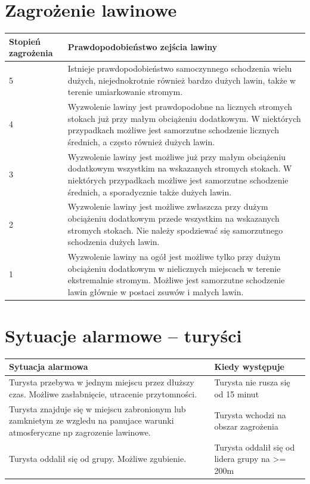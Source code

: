 \documentclass[a4paper,12pt]{article}
\begin{document}
\section{Zagrożenie lawinowe}
\begin{center}
    \begin{longtable}{ | l | p{10cm} |}
    \hline
    \textbf{Stopień zagrożenia} & \textbf{Prawdopodobieństwo zejścia lawiny}\\ \hline
    5 & Istnieje prawdopodobieństwo samoczynnego schodzenia wielu dużych, niejednokrotnie
również bardzo dużych lawin, także w terenie
umiarkowanie stromym. \\\hline
	4 & Wyzwolenie lawiny jest prawdopodobne na
licznych stromych stokach już przy małym
obciążeniu dodatkowym. W niektórych
przypadkach możliwe jest samorzutne
schodzenie licznych średnich, a często
również dużych lawin.\\\hline
	3 & Wyzwolenie lawiny jest możliwe już przy
małym obciążeniu dodatkowym wszystkim na
wskazanych stromych stokach. W niektórych
przypadkach możliwe jest samorzutne
schodzenie średnich, a sporadycznie także
dużych lawin.\\\hline
	2 & Wyzwolenie lawiny jest możliwe zwłaszcza
przy dużym obciążeniu dodatkowym przede
wszystkim na wskazanych stromych stokach.
Nie należy spodziewać się samorzutnego
schodzenia dużych lawin.\\\hline
	1 & Wyzwolenie lawiny na ogół jest możliwe tylko
przy dużym obciążeniu dodatkowym w
nielicznych miejscach w terenie ekstremalnie
stromym. Możliwe jest samorzutne schodzenie
lawin głównie w postaci zsuwów i małych
lawin. \\\hline
    \end{longtable}
\end{center}
\newpage
\section{Sytuacje alarmowe -- turyści}
\begin{center}
\begin{longtable}{ | p{10cm} | p{5cm} | }
\hline
	\textbf{Sytuacja alarmowa} & \textbf{Kiedy występuje}\\\hline
	Turysta przebywa w jednym miejscu przez
dłuższy czas. Możliwe zasłabnięcie, utracenie
przytomności. & Turysta nie rusza się od 15 minut\\\hline
	Turysta znajduje się w miejscu zabronionym lub
zamknietym ze wzgledu na panujace warunki
atmosferyczne np zagrozenie lawinowe. & Turysta wchodzi na obszar zagrożenia\\\hline
	Turysta oddalił się od grupy. Możliwe zgubienie. & Turysta oddalił się od lidera grupy na >= 200m\\\hline
\end{longtable}
\end{center}
\newpage
\end{document}
